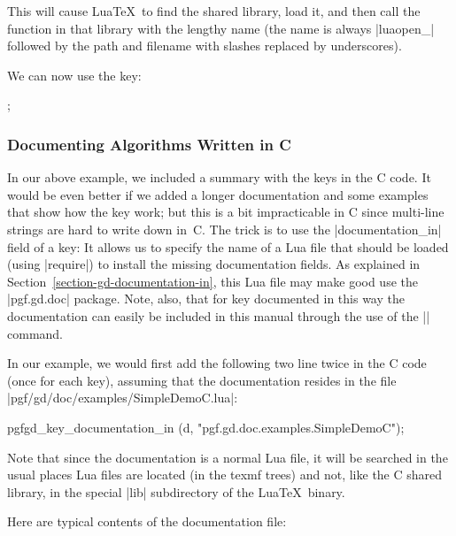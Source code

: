 This will cause Lua\TeX\ to find the shared library, load it, and then
call the function in that library with the lengthy name (the name is
always |luaopen_| followed by the path and filename with slashes
replaced by underscores). 

We can now use the key:

\begin{codeexample}[]
\tikz {};
\end{codeexample}

\subsubsection{Documenting Algorithms Written in C}
\label{section-gd-documenting-c-algos}


In our above example, we included a summary with the keys in the C
code. It would be even better if we added a longer documentation and
some examples that show how the key work; but this is a bit
impracticable in C since multi-line strings are hard to write down
in~C. The trick is to use the |documentation_in| field of a key: It
allows us to specify the name of a Lua file that should be loaded
(using |require|) to install the missing documentation fields. As
explained in Section~\ref{section-gd-documentation-in}, this Lua file
may make good use the |pgf.gd.doc| package. Note, also, that for key
documented in this way the documentation can easily be included in
this manual through the use of the || command.

In our example, we would first add the following two line twice in the
C code (once for each key), assuming that the documentation resides in
the file |pgf/gd/doc/examples/SimpleDemoC.lua|:

\begin{codeexample}
  pgfgd_key_documentation_in (d, "pgf.gd.doc.examples.SimpleDemoC");
\end{codeexample}

Note that since the documentation is a normal Lua file, it will be
searched in the usual places Lua files are located (in the texmf
trees) and not, like the C shared library, in the special |lib|
subdirectory of the Lua\TeX\ binary.

Here are typical contents of the documentation file:


